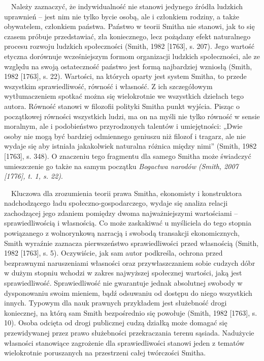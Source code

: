 \documentclass[a4paper]{article}
\begin{document}
 \ \ Należy zaznaczyć, że indywidualność nie stanowi jedynego źródła ludzkich uprawnień – jest nim nie tylko bycie osobą, ale i członkiem rodziny, a także obywatelem, członkiem państwa. Państwo w teorii Smitha nie stanowi, jak to się czasem próbuje przedstawiać, zła koniecznego, lecz pożądany efekt naturalnego procesu rozwoju ludzkich społeczności \label{ref:RNDLLHqgagP0f}(Smith, 1982 [1763], s. 207). Jego wartość etyczna dorównuje wcześniejszym formom organizacji ludzkich społeczności, ale ze względu na swoją ostateczność państwo jest formą najbardziej wzniosłą \label{ref:RNDKABNqSVWe4}(Smith, 1982 [1763], s. 22). Wartości, na których oparty jest system Smitha, to przede wszystkim sprawiedliwość, równość i własność. Z ich szczegółowym wytłumaczeniem spotkać można się wielokrotnie we wszystkich dziełach tego autora. Równość stanowi w filozofii polityki Smitha punkt wyjścia. Pisząc o początkowej równości wszystkich ludzi, ma on na myśli nie tylko równość w sensie moralnym, ale i podobieństwo przyrodzonych talentów i umiejętności: „Dwie osoby nie mogą być bardziej odmiennego geniuszu niż filozof i tragarz, ale nie wydaje się aby istniała jakakolwiek naturalna różnica między nimi” \label{ref:RNDlX5tlrl30w}(Smith, 1982 [1763], s. 348). O znaczeniu tego fragmentu dla samego Smitha może świadczyć umieszczenie go także na samym początku \textit{Bogactwa narodów }\label{ref:RNDeavcgj1oLe}\textit{(Smith, 2007 [1776], t. 1, s. 22)}.

\ \ Kluczowa dla zrozumienia teorii prawa Smitha, ekonomisty i konstruktora nadchodzącego ładu społeczno-gospodarczego, wydaje się analiza relacji zachodzącej jego zdaniem pomiędzy dwoma najważniejszymi wartościami – sprawiedliwością i własnością. Co może zaskakiwać u myśliciela do tego stopnia powiązanego z wolnorynkową narracją i swobodą transakcji ekonomicznych, Smith wyraźnie zaznacza pierwszeństwo sprawiedliwości przed własnością \label{ref:RNDOpWvKBrvEq}(Smith, 1982 [1763], s. 5). Oczywiście, jak sam autor podkreśla, ochrona przed bezprawnymi naruszeniami własności oraz przywłaszczaniem sobie cudzych dóbr w dużym stopniu wchodzi w zakres najwyższej społecznej wartości, jaką jest sprawiedliwość. Sprawiedliwość nie gwarantuje jednak absolutnej swobody w dysponowaniu swoim mieniem, bądź odsuwaniu od dostępu do niego wszystkich innych. Typowym dla nauk prawnych przykładem jest służebność drogi koniecznej, na którą sam Smith bezpośrednio się powołuje \label{ref:RNDA439GNDamV}(Smith, 1982 [1763], s. 10). Osoba odcięta od drogi publicznej cudzą działką może domagać się przewidywanej przez prawo służebności przekraczania terenu sąsiada. Nadużycie własności stanowiące zagrożenie dla sprawiedliwości stanowi jeden z tematów wielokrotnie poruszanych na przestrzeni całej twórczości Smitha.
\end{document}
